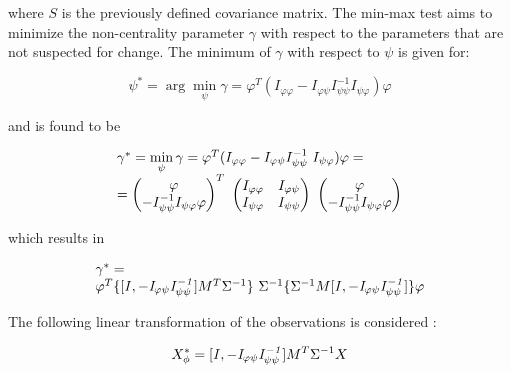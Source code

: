 \documentclass[journal]{IEEEtran}
\begin{document}
\noindent where $S$ is the previously defined covariance matrix. The min-max test aims to minimize the non-centrality parameter $\gamma$ with respect to the parameters that
are not suspected for change. The minimum of $\gamma$ with respect to $\psi$ is given for:

\begin{equation}
\psi^{*}=\arg\min\limits_{\psi}{\gamma}={\varphi^T}(I_{\varphi\varphi}-I_{\varphi\psi}
{I_{\psi\psi}^{-1}}I_{\psi\varphi})\varphi
\end{equation}

\noindent
and is found to be

\begin{equation}
\begin{tabular}{l}
$\gamma^{*}=\min\limits_{\psi}{\gamma} =
{\varphi}^T(I_{\varphi\varphi}-I_{\varphi\psi}{I_{\psi\psi}^{-1}} \
{I_{\psi\varphi}}){\varphi} =$\\
$=\begin{pmatrix}
\varphi  \\ -I_{\psi\psi}^{-1}I_{\psi\varphi}\varphi
\end{pmatrix}^T \
\begin{pmatrix}
I_{\varphi\varphi} & I_{\varphi\psi} \\
I_{\psi\varphi}    & I_{\psi\psi}
\end{pmatrix} \
\begin{pmatrix}
\varphi \\ {-I_{\psi\psi}^{-1}}{I_{\psi\varphi}}\varphi
\end{pmatrix}$
\end{tabular}
\end{equation}

\noindent
which results in

\begin{equation}
\begin{tabular}{l}
$\gamma^{*}=$\\
${\varphi^T} \{ [{\it{I},-I_{\varphi\psi}{I_{\psi\psi}^{-1}}}]{M^T}{\Sigma^{-1} \} \
\Sigma^{-1} \{ \Sigma^{-1}M [\it{I},-I_{\varphi\psi}{I_{\psi\psi}^{-1}}}] \}  \varphi$
\end{tabular}
\end{equation}

\noindent
The following linear transformation of the observations is considered :

\begin{equation}
X_{\phi}^{*}={[\it{I},-I_{\varphi\psi}{I_{\psi\psi}^{-1}}]}{M^T}{\Sigma^{-1}}X
\end{equation}
\end{document}
